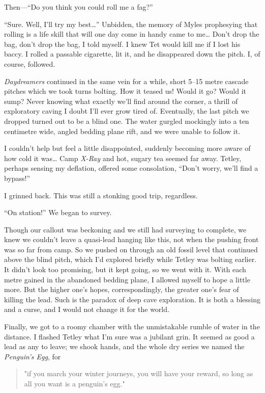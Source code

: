 Then---``Do you think you could roll me a fag?''

``Sure. Well, I'll try my best\ldots{}'' Unbidden, the memory of Myles
prophesying that rolling is a life skill that will one day come in handy
came to me\ldots{} Don't drop the bag, don't drop the bag, I told
myself. I knew Tet would kill me if I lost his baccy. I rolled a
passable cigarette, lit it, and he disappeared down the pitch. I, of
course, followed.

\emph{Daydreamers} continued in the same vein for a while, short 5--15
metre cascade pitches which we took turns bolting. How it teased us!
Would it go? Would it sump? Never knowing what exactly we'll find around
the corner, a thrill of exploratory caving I doubt I'll ever grow tired
of. Eventually, the last pitch we dropped turned out to be a blind one.
The water gurgled mockingly into a ten centimetre wide, angled bedding
plane rift, and we were unable to follow it.

I couldn't help but feel a little disappointed, suddenly becoming more
aware of how cold it was\ldots{} Camp \emph{X-Ray} and hot, sugary tea
seemed far away. Tetley, perhaps sensing my deflation, offered some
consolation, ``Don't worry, we'll find a bypass!''

I grinned back. This was still a stonking good trip, regardless.

``On station!'' We began to survey.

Though our callout was beckoning and we still had surveying to complete,
we knew we couldn't leave a quasi-lead hanging like this, not when the
pushing front was so far from camp. So we pushed on through an old
fossil level that continued above the blind pitch, which I'd explored
briefly while Tetley was bolting earlier. It didn't look too promising,
but it kept going, so we went with it. With each metre gained in the
abandoned bedding plane, I allowed myself to hope a little more. But the
higher one's hopes, correspondingly, the greater one's fear of killing
the lead. Such is the paradox of deep cave exploration. It is both a
blessing and a curse, and I would not change it for the world.

Finally, we got to a roomy chamber with the unmistakable rumble of water
in the distance. I flashed Tetley what I'm sure was a jubilant grin. It
seemed as good a lead as any to leave; we shook hands, and the whole dry
series we named the \emph{Penguin's Egg}, for

\begin{quote}"if you march your winter journeys, you will have your reward, so long as all you want is a penguin’s egg." \end{quote}

